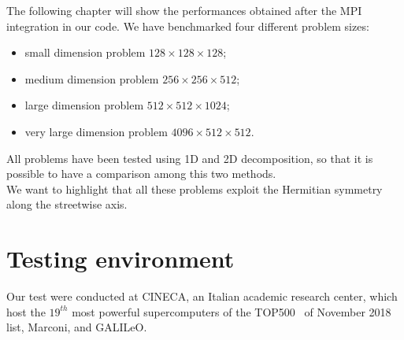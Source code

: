 The following chapter will show the performances obtained after the MPI integration in our code.
We have benchmarked four different problem sizes:
\begin{itemize}
\item small dimension problem $128\times 128 \times 128$;
\item medium dimension problem $256\times 256\times 512$;
\item large dimension problem $512\times 512\times 1024$;
\item very large dimension problem $4096\times 512\times 512$.  
\end{itemize}
All problems have been tested using 1D and 2D decomposition, so that it is possible to have a comparison among this two methods.
\\
We want to highlight that all these problems exploit the Hermitian symmetry along the streetwise axis.
\section{Testing environment}
Our test were conducted at CINECA\cite{Cineca}, an Italian academic research center, which host the $19^{th}$ most powerful supercomputers of the TOP500~\cite{top500} of November 2018 list, Marconi, and GALILeO.

